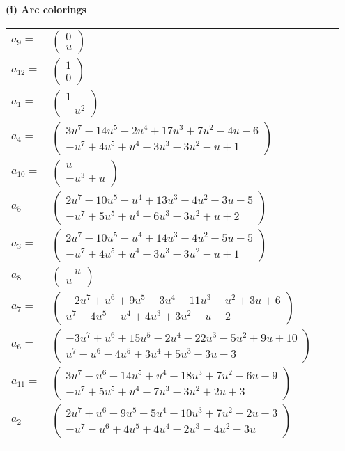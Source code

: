 \documentclass[1p]{elsarticle_modified}
\theoremstyle{definition}
\begin{document}
\flushleft \textbf{(i) Arc colorings}\\
\begin{tabular}{m{7pt} m{180pt} m{7pt} m{180pt} }
\flushright $a_{9}=$&$\begin{pmatrix}0\\u\end{pmatrix}$ \\
\flushright $a_{12}=$&$\begin{pmatrix}1\\0\end{pmatrix}$ \\
\flushright $a_{1}=$&$\begin{pmatrix}1\\- u^2\end{pmatrix}$ \\
\flushright $a_{4}=$&$\begin{pmatrix}3 u^7-14 u^5-2 u^4+17 u^3+7 u^2-4 u-6\\- u^7+4 u^5+u^4-3 u^3-3 u^2- u+1\end{pmatrix}$ \\
\flushright $a_{10}=$&$\begin{pmatrix}u\\- u^3+u\end{pmatrix}$ \\
\flushright $a_{5}=$&$\begin{pmatrix}2 u^7-10 u^5- u^4+13 u^3+4 u^2-3 u-5\\- u^7+5 u^5+u^4-6 u^3-3 u^2+u+2\end{pmatrix}$ \\
\flushright $a_{3}=$&$\begin{pmatrix}2 u^7-10 u^5- u^4+14 u^3+4 u^2-5 u-5\\- u^7+4 u^5+u^4-3 u^3-3 u^2- u+1\end{pmatrix}$ \\
\flushright $a_{8}=$&$\begin{pmatrix}- u\\u\end{pmatrix}$ \\
\flushright $a_{7}=$&$\begin{pmatrix}-2 u^7+u^6+9 u^5-3 u^4-11 u^3- u^2+3 u+6\\u^7-4 u^5- u^4+4 u^3+3 u^2- u-2\end{pmatrix}$ \\
\flushright $a_{6}=$&$\begin{pmatrix}-3 u^7+u^6+15 u^5-2 u^4-22 u^3-5 u^2+9 u+10\\u^7- u^6-4 u^5+3 u^4+5 u^3-3 u-3\end{pmatrix}$ \\
\flushright $a_{11}=$&$\begin{pmatrix}3 u^7- u^6-14 u^5+u^4+18 u^3+7 u^2-6 u-9\\- u^7+5 u^5+u^4-7 u^3-3 u^2+2 u+3\end{pmatrix}$ \\
\flushright $a_{2}=$&$\begin{pmatrix}2 u^7+u^6-9 u^5-5 u^4+10 u^3+7 u^2-2 u-3\\- u^7- u^6+4 u^5+4 u^4-2 u^3-4 u^2-3 u\end{pmatrix}$\\&\end{tabular}
\end{document}
